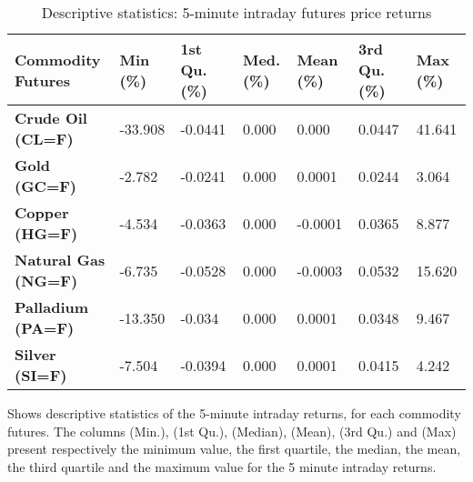 \begin{landscape}
\begin{table}[]
\begin{center}
\caption{Descriptive statistics: 5-minute intraday futures price returns}
\label{tab:stat4}
\begin{tabular}{@{}lllllll@{}}
\toprule
\textbf{Commodity Futures}  & \textbf{Min (\%)} & \textbf{1st Qu. (\%)} & \textbf{Med. (\%)} & \textbf{Mean (\%)} & \textbf{3rd Qu. (\%)} & \textbf{Max (\%)} \\ \midrule
\textbf{Crude Oil (CL=F)}   & -33.908          & -0.0441               & 0.000               & 0.000             & 0.0447                & 41.641        \\
\textbf{Gold (GC=F)}        & -2.782           & -0.0241               & 0.000               & 0.0001             & 0.0244                & 3.064         \\
\textbf{Copper (HG=F)}      & -4.534           & -0.0363               & 0.000               & -0.0001            & 0.0365                & 8.877         \\
\textbf{Natural Gas (NG=F)} & -6.735           & -0.0528               & 0.000               & -0.0003            & 0.0532                & 15.620        \\
\textbf{Palladium (PA=F)}   & -13.350          & -0.034               & 0.000               & 0.0001             & 0.0348                & 9.467         \\
\textbf{Silver (SI=F)}      & -7.504           & -0.0394               & 0.000               & 0.0001             & 0.0415                & 4.242         \\ \bottomrule
\end{tabular}
\end{center}
\begin{tablenotes}\item 
        \singlespacing
        \footnotesize
Shows descriptive statistics of the 5-minute intraday returns, for each commodity futures. The columns (Min.), (1st Qu.), (Median), (Mean), (3rd Qu.) and (Max) present respectively the minimum value, the first quartile, the median, the mean, the third quartile and the maximum value for the 5 minute intraday returns.
\end{tablenotes}
\end{table}
\end{landscape}



